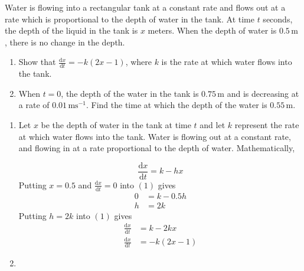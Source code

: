 \documentclass[11pt,a4paper]{book}
\begin{document}
\newpage


\begin{example}

Water is flowing into a rectangular tank at a constant rate and flows
out at a rate which is proportional to the depth of water in the tank.
At time $t$ seconds, the depth of the liquid in the tank is $x$
meters. When the depth of water is $0.5\,\text{m}$ , there is no
change in the depth.

\begin{enumerate}[label=(\alph*)]

\item Show that ${\displaystyle \frac{\mathrm{d}x}{\mathrm{d}t}=-k\left(2x-1\right)}$,
where $k$ is the rate at which water flows into the tank.

\item When $t=0$, the depth of the water in the tank is $0.75\,\text{m}$
and is decreasing at a rate of $0.01\,\text{ms}^{-1}$. Find the time
at which the depth of the water is $0.55\,\text{m}$.

\end{enumerate}

\Solution

\begin{enumerate}[label=(\alph*)]

\item

Let $x$ be the depth of water in the tank at time $t$ and let $k$
represent the rate at which water flows into the tank. Water is flowing
out at a constant rate, and flowing in at a rate proportional to the
depth of water. Mathematically,

\[
\frac{\mathrm{d}x}{\mathrm{d}t}=k-hx\tag{1}
\]
Putting $x=0.5$ and ${\displaystyle \frac{\mathrm{d}x}{\mathrm{d}t}=0}$ into $\left(1\right)$
gives
\begin{align*}
0 & =k-0.5h\\
h & =2k
\end{align*}
Putting $h=2k$ into $\left(1\right)$ gives
\begin{align*}
\frac{\mathrm{d}x}{\mathrm{d}t} & =k-2kx\\
\frac{\mathrm{d}x}{\mathrm{d}t} & =-k\left(2x-1\right)\tag{2}
\end{align*}

\item


\end{enumerate}
\end{example}
\end{document}

